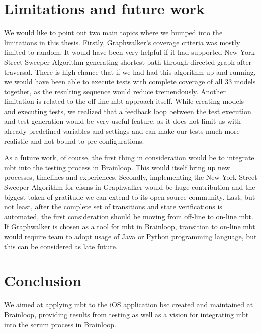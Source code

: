 \section{Limitations and future work}

\par
We would like to point out two main topics where we bumped into the limitations in this thesis. Firstly, Graphwalker's coverage criteria was mostly limited to random. It would have been very helpful if it had supported New York Street Sweeper Algorithm generating shortest path through directed graph after traversal. There is high chance that if we had had this algorithm up and running, we would have been able to execute tests with complete coverage of all 33 models together, as the resulting sequence would reduce tremendously. Another limitation is related to the off-line \acrshort{mbt} approach itself. While creating models and executing tests, we realized that a feedback loop between the test execution and test generation would be very useful feature, as it does not limit us with already predefined variables and settings and can make our tests much more realistic and not bound to pre-configurations.

\par
As a future work, of course, the first thing in consideration would be to integrate \acrshort{mbt} into the testing process in Brainloop. This would itself bring up new processes, timelines and experiences.  Secondly, implementing the New York Street Sweeper Algorithm for \acrshort{efsm}s in Graphwalker would be huge contribution and the biggest token of gratitude we can extend to its open-source community. Last, but not least, after the complete set of transitions and state verifications is automated, the first consideration should be moving from off-line to on-line \acrshort{mbt}. If Graphwalker is chosen as a tool for \acrshort{mbt} in Brainloop, transition to on-line \acrshort{mbt} would require team to adopt usage of Java or Python programming language, but this can be considered as late future.

\section{Conclusion}

\par
We aimed at applying \acrshort{mbt} to the iOS application \acrshort{bsc} created and maintained at Brainloop, providing results from testing as well as a vision for integrating \acrshort{mbt} into the scrum process in Brainloop.

